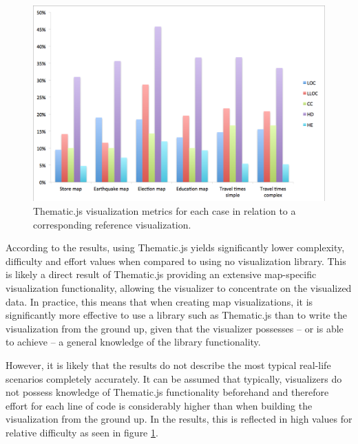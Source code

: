\begin{figure}[htbp]
  \begin{center}
    \includegraphics[width=\textwidth]{images/evaluation-results.png}
    \caption{Thematic.js visualization metrics for each case in relation to a corresponding reference visualization.  }
    \label{fig:evaluationchart}
  \end{center}
\end{figure}


According to the results, using Thematic.js yields significantly lower complexity, difficulty and effort values when compared to using no visualization library. This is likely a direct result of Thematic.js providing an extensive map-specific visualization functionality, allowing the visualizer to concentrate on the visualized data. In practice, this means that when creating map visualizations, it is significantly more effective to use a library such as Thematic.js than to write the visualization from the ground up, given that the visualizer possesses -- or is able to achieve -- a general knowledge of the library functionality.


However, it is likely that the results do not describe the most typical real-life scenarios completely accurately. It can be assumed that typically, visualizers do not possess knowledge of Thematic.js functionality beforehand and therefore effort for each line of code is considerably higher than when building the visualization from the ground up. In the results, this is reflected in high values for relative difficulty as seen in figure \ref{fig:evaluationchart}.

